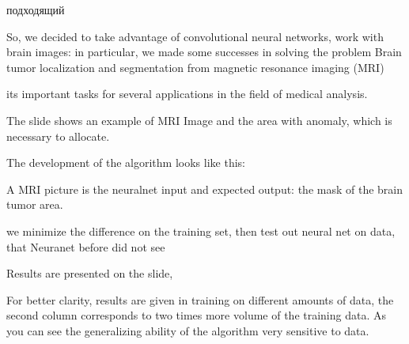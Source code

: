 




% 
% 
% 
% 






















подходящий
% 

So, we decided to take advantage of convolutional neural networks, work with brain images:
in particular, we made some successes in solving the problem
Brain tumor localization and segmentation from magnetic resonance imaging (MRI) 

its important tasks for several applications in the field of medical analysis.

The slide shows an example of MRI Image and the area with anomaly, which is necessary to allocate.


The development of the algorithm looks like this: 

A MRI picture is  the neuralnet input and 
expected output: the mask of the brain tumor area.

we minimize the difference on the training set,
 then test out neural net on data, that Neuranet before did not see

 Results are presented on the slide,

For better clarity, results are given in training on different amounts of data, the second column corresponds to two times more volume of the training data.
 As you can see the generalizing ability of the algorithm  very sensitive to data. 

